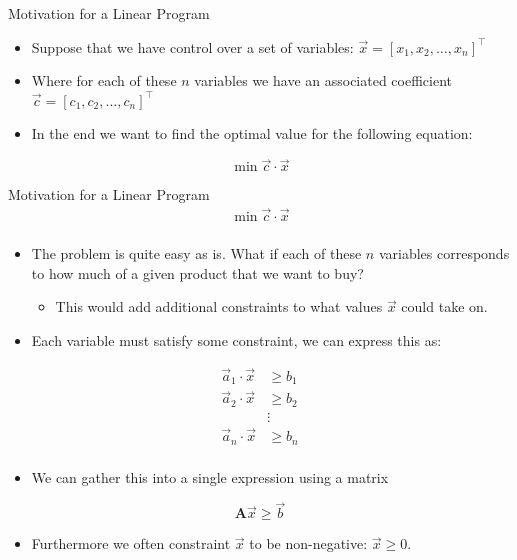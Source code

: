 \documentclass[
	11pt, %
]{beamer}
\begin{document}
\begin{frame}[label={sec:org7e6dba1}]{Motivation for a Linear Program}
\begin{itemize}
\item Suppose that we have control over a set of variables: \(\vec{x} = [x_1, x_2, \ldots, x_n]^\top\)
\end{itemize}
\pause
\begin{itemize}
\item Where for each of these \(n\) variables we have an associated coefficient \(\vec{c} = [c_1, c_2, \ldots, c_n]^\top\)
\end{itemize}
\pause
\begin{itemize}
\item In the end we want to find the optimal value for the following equation:
\end{itemize}
\[
\min \vec{c} \cdot \vec{x}
\]
\end{frame}
\begin{frame}[label={sec:orgc3775a6}]{Motivation for a Linear Program}
\vspace{-3.5em}
\begin{gather*}
\min \vec{c} \cdot \vec{x} \\
\end{gather*}

\vspace{-1em}
\begin{itemize}
\item The problem is quite easy as is. What if each of these \(n\) variables
corresponds to how much of a given product that we want to buy?
\begin{itemize}
\item This would add additional constraints to what values \(\vec{x}\) could
take on.
\end{itemize}
\end{itemize}
\pause
\begin{itemize}
\item Each variable must satisfy some constraint, we can express this as:
\end{itemize}
\vspace{-2em}
\begin{align*}
\vec{a}_1 \cdot \vec{x} &\geq b_1 \\
\vec{a}_2 \cdot \vec{x} &\geq b_2 \\
& \vdots  \\
\vec{a}_n \cdot \vec{x} &\geq b_n \\
\end{align*}
\vspace{-3.5em}
\pause
\begin{itemize}
\item We can gather this into a single expression using a matrix
\end{itemize}
\[
\mathbf{A} \vec{x} \geq \vec{b}
\]

\pause
\vspace{-2em}
\begin{itemize}
\item Furthermore we often constraint \(\vec{x}\) to be non-negative: \(\vec{x} \geq
  0\).
\end{itemize}
\end{frame}
\end{document}
